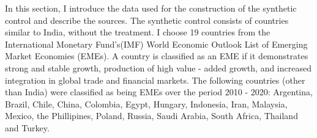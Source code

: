 \documentclass[12pt,nobind, a4paper]{reedthesis}
\begin{document}
 In this section, I introduce the data used for the construction of the synthetic control and describe the sources. The synthetic control consists of countries similar to India, without the treatment. I choose 19 countries from the International Monetary Fund's(IMF) World Economic Outlook List of Emerging Market Economies (EMEs). A country is classified as an EME if it demonstrates strong and stable growth, production of high value - added growth, and increased integration in global trade and financial markets. The following countries (other than India) were classified as being EMEs over the period 2010 - 2020: Argentina, Brazil, Chile, China, Colombia, Egypt, Hungary, Indonesia, Iran, Malaysia, Mexico, the Phillipines, Poland, Russia, Saudi Arabia, South Africa, Thailand and Turkey.
 \linebreak
\end{document}
